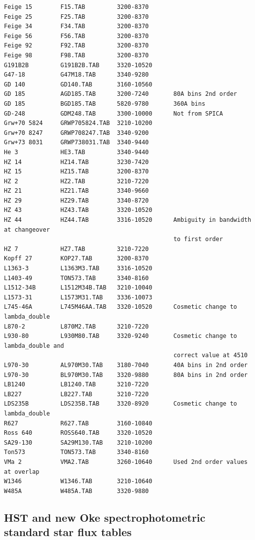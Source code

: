 \begin{verbatim}
Feige 15        F15.TAB         3200-8370
Feige 25        F25.TAB         3200-8370
Feige 34        F34.TAB         3200-8370
Feige 56        F56.TAB         3200-8370
Feige 92        F92.TAB         3200-8370
Feige 98        F98.TAB         3200-8370
G191B2B         G191B2B.TAB     3320-10520
G47-18          G47M18.TAB      3340-9280
GD 140          GD140.TAB       3160-10560
GD 185          AGD185.TAB      3200-7240       80A bins 2nd order
GD 185          BGD185.TAB      5820-9780       360A bins
GD-248          GDM248.TAB      3300-10000      Not from SPICA
Grw+70 5824     GRWP705824.TAB  3210-10200
Grw+70 8247     GRWP708247.TAB  3340-9200
Grw+73 8031     GRWP738031.TAB  3340-9440
He 3            HE3.TAB         3340-9440
HZ 14           HZ14.TAB        3230-7420
HZ 15           HZ15.TAB        3200-8370
HZ 2            HZ2.TAB         3210-7220
HZ 21           HZ21.TAB        3340-9660
HZ 29           HZ29.TAB        3340-8720
HZ 43           HZ43.TAB        3320-10520
HZ 44           HZ44.TAB        3316-10520      Ambiguity in bandwidth at changeover
                                                to first order
HZ 7            HZ7.TAB         3210-7220
Kopff 27        KOP27.TAB       3200-8370
L1363-3         L1363M3.TAB     3316-10520
L1403-49        TON573.TAB      3340-8160
L1512-34B       L1512M34B.TAB   3210-10040
L1573-31        L1573M31.TAB    3336-10073
L745-46A        L745M46AA.TAB   3320-10520      Cosmetic change to lambda_double
L870-2          L870M2.TAB      3210-7220
L930-80         L930M80.TAB     3320-9240       Cosmetic change to lambda_double and
                                                correct value at 4510
L970-30         AL970M30.TAB    3180-7040       40A bins in 2nd order
L970-30         BL970M30.TAB    3320-9880       80A bins in 2nd order
LB1240          LB1240.TAB      3210-7220
LB227           LB227.TAB       3210-7220
LDS235B         LDS235B.TAB     3320-8920       Cosmetic change to lambda_double
R627            R627.TAB        3160-10840
Ross 640        ROSS640.TAB     3320-10520
SA29-130        SA29M130.TAB    3210-10200
Ton573          TON573.TAB      3340-8160
VMa 2           VMA2.TAB        3260-10640      Used 2nd order values at overlap
W1346           W1346.TAB       3210-10640
W485A           W485A.TAB       3320-9880
\end{verbatim}\normalsize


\subsection{\label{standard2}HST and new Oke spectrophotometric standard star flux tables}

